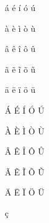 \documentclass[12pt,a4paper]{article}
\begin{document}
á
é
í
ó
ú
 
à
è
ì
ò
ù
 
â
ê
î
ô
û
 
ã
ẽ
ĩ
õ
ũ
 
ä
ë
ï
ö
ü
 
Á
É
Í
Ó
Ú
 
À
È
Ì
Ò
Ù
 
Â
Ê
Î
Ô
Û
 
Ã
Ẽ
Ĩ
Õ
Ũ
 
Ä
Ë
Ï
Ö
Ü
 
ç
\end{document}

